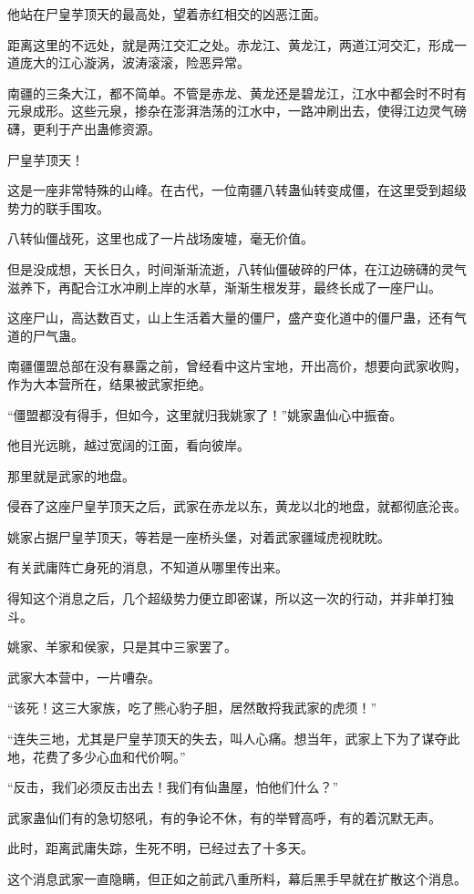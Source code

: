 \begin{this_body}
他站在尸皇芋顶天的最高处，望着赤红相交的凶恶江面。

距离这里的不远处，就是两江交汇之处。赤龙江、黄龙江，两道江河交汇，形成一道庞大的江心漩涡，波涛滚滚，险恶异常。

南疆的三条大江，都不简单。不管是赤龙、黄龙还是碧龙江，江水中都会时不时有元泉成形。这些元泉，掺杂在澎湃浩荡的江水中，一路冲刷出去，使得江边灵气磅礴，更利于产出蛊修资源。

尸皇芋顶天！

这是一座非常特殊的山峰。在古代，一位南疆八转蛊仙转变成僵，在这里受到超级势力的联手围攻。

八转仙僵战死，这里也成了一片战场废墟，毫无价值。

但是没成想，天长日久，时间渐渐流逝，八转仙僵破碎的尸体，在江边磅礴的灵气滋养下，再配合江水冲刷上岸的水草，渐渐生根发芽，最终长成了一座尸山。

这座尸山，高达数百丈，山上生活着大量的僵尸，盛产变化道中的僵尸蛊，还有气道的尸气蛊。

南疆僵盟总部在没有暴露之前，曾经看中这片宝地，开出高价，想要向武家收购，作为大本营所在，结果被武家拒绝。

“僵盟都没有得手，但如今，这里就归我姚家了！”姚家蛊仙心中振奋。

他目光远眺，越过宽阔的江面，看向彼岸。

那里就是武家的地盘。

侵吞了这座尸皇芋顶天之后，武家在赤龙以东，黄龙以北的地盘，就都彻底沦丧。

姚家占据尸皇芋顶天，等若是一座桥头堡，对着武家疆域虎视眈眈。

有关武庸阵亡身死的消息，不知道从哪里传出来。

得知这个消息之后，几个超级势力便立即密谋，所以这一次的行动，并非单打独斗。

姚家、羊家和侯家，只是其中三家罢了。

武家大本营中，一片嘈杂。

“该死！这三大家族，吃了熊心豹子胆，居然敢捋我武家的虎须！”

“连失三地，尤其是尸皇芋顶天的失去，叫人心痛。想当年，武家上下为了谋夺此地，花费了多少心血和代价啊。”

“反击，我们必须反击出去！我们有仙蛊屋，怕他们什么？”

武家蛊仙们有的急切怒吼，有的争论不休，有的举臂高呼，有的着沉默无声。

此时，距离武庸失踪，生死不明，已经过去了十多天。

这个消息武家一直隐瞒，但正如之前武八重所料，幕后黑手早就在扩散这个消息。


\end{this_body}
